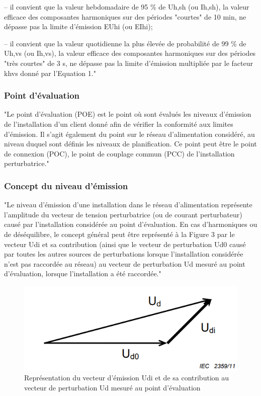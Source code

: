 – il convient que la valeur hebdomadaire de 95 \% de Uh,sh (ou Ih,sh), la valeur efficace des composantes harmoniques sur des périodes "courtes" de 10 min, ne dépasse pas la limite d'émission EUhi (ou EIhi);

– il convient que la valeur quotidienne la plus élevée de probabilité de 99 \% de Uh,vs (ou Ih,vs), la valeur efficace des composantes harmoniques sur des périodes "très courtes" de 3 s, ne dépasse pas la limite d'émission multipliée par le facteur khvs donné par l'Equation 1."


\subsubsection{Point d'évaluation}

"Le point d'évaluation (POE) est le point où sont évalués les niveaux d'émission de l'installation d'un client donné afin de vérifier la conformité aux limites d'émission. Il s'agit également du point sur le réseau d'alimentation considéré, au niveau duquel sont définis les niveaux de planification. Ce point peut être le point de connexion (POC), le point de couplage commun (PCC) de l'installation perturbatrice."

\subsubsection{Concept du niveau d'émission}

"Le niveau d'émission d'une installation dans le réseau d'alimentation représente l'amplitude du vecteur de tension perturbatrice (ou de courant perturbateur) causé par l'installation considérée au point d'évaluation. En cas d'harmoniques ou de déséquilibre, le concept général peut être représenté à la Figure 3 par le vecteur Udi et sa contribution (ainsi que le vecteur de perturbation Ud0 causé par toutes les autres sources de perturbations lorsque l'installation considérée n'est pas raccordée au réseau) au vecteur de perturbation Ud mesuré au point d'évaluation, lorsque l'installation a été raccordée."

\begin{figure}[H]
    \begin{center}
        \includegraphics[width=\textwidth]{assets/figures/IECTR61000_fig1.png}
    \end{center}
    \caption{Représentation du vecteur d'émission Udi et de sa contribution au vecteur de perturbation Ud mesuré au point d'évaluation}
    \label{IECTR61000_fig1}
\end{figure}

